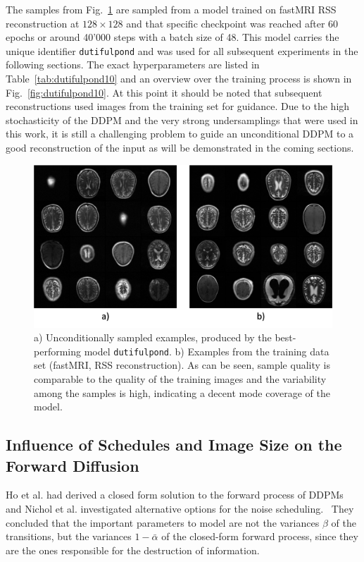 The samples from Fig.~\ref{fig:uncondsampling} are sampled from a model trained on fastMRI RSS reconstruction at $128\times 128$ and that specific checkpoint was reached after 60 epochs or around 40'000 steps with a batch size of 48. This model carries the unique identifier \texttt{dutiful\-pond} and was used for all subsequent experiments in the following sections. The exact hyperparameters are listed in Table~\ref{tab:dutifulpond10} and an overview over the training process is shown in Fig.~\ref{fig:dutifulpond10}. At this point it should be noted that subsequent reconstructions used images from the training set for guidance. Due to the high stochasticity of the DDPM and the very strong undersamplings that were used in this work, it is still a challenging problem to guide an unconditional DDPM to a good reconstruction of the input as will be demonstrated in the coming sections.
\begin{figure}[h]
    \centering
    \includegraphics[width=.66\textwidth]{images/samples_unconditional.png}
    \caption[Samples from Data Set and Unconditional Sampling]{a) Unconditionally sampled examples, produced by the best-performing model \texttt{dutiful\-pond}. b) Examples from the training data set (fastMRI, RSS reconstruction). As can be seen, sample quality is comparable to the quality of the training images and the variability among the samples is high, indicating a decent mode coverage of the model.}
    \label{fig:uncondsampling}
\end{figure}

\subsection{Influence of Schedules and Image Size on the Forward Diffusion}
\label{sec:forward_diff_experiments}
Ho et al. had derived a closed form solution to the forward process of DDPMs and Nichol et al. investigated alternative options for the noise scheduling.~\autocite{ho2020denoising,nichol2021improved} They concluded that the important parameters to model are not the variances $\beta$ of the transitions, but the variances $1-\bar{\alpha}$ of the closed-form forward process, since they are the ones responsible for the destruction of information.

